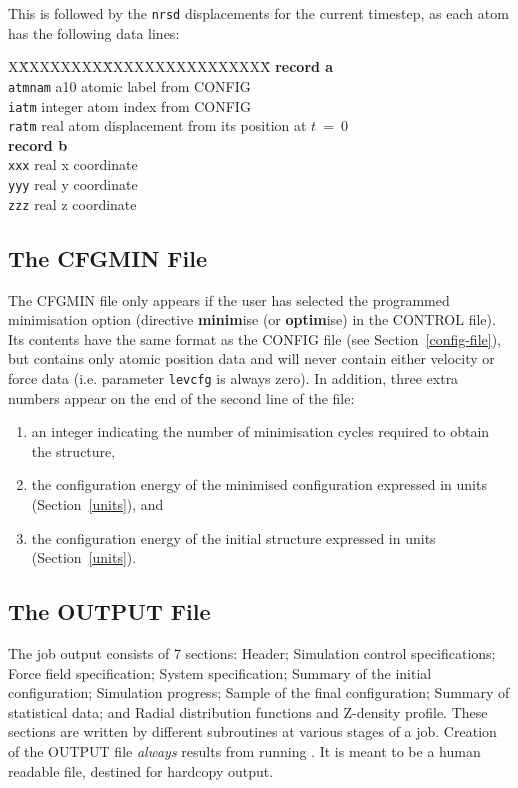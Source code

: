 This is followed by the {\tt nrsd} displacements for the current
timestep, as each atom has the following data lines:
\begin{tabbing}
X\=XXXXXXXX\=XXXXXXXXXXXXXXXX\=\kill
{\bf record a}  \\
\> {\tt atmnam} \> a10     \> atomic label from CONFIG \\
\> {\tt iatm}   \> integer \> atom index from CONFIG \\
\> {\tt ratm}   \> real    \> atom displacement from its position at $t~=~0$ \\
{\bf record b} \\
\> {\tt xxx}    \> real    \> x coordinate \\
\> {\tt yyy}    \> real    \> y coordinate \\
\> {\tt zzz}    \> real    \> z coordinate
\end{tabbing}

\subsection{The CFGMIN File}
\label{cfgminfile}

The CFGMIN file only appears if the user has selected the programmed
minimisation option (directive {\bf minim}ise (or {\bf optim}ise)
in the CONTROL file).  Its contents have the same format as the
CONFIG file (see Section~\ref{config-file}), but contains only atomic
position data and will never contain either velocity or force data
(i.e. parameter {\tt levcfg} is always zero).  In addition, three
extra numbers appear on the end of the second line of the file:
\begin{enumerate}
\item an integer indicating the number of minimisation cycles
required to obtain the structure,
\item the configuration energy of the minimised configuration expressed
in \D units (Section~\ref{units}), and
\item the configuration energy of the initial structure expressed
in \D units (Section~\ref{units}).
\end{enumerate}

\subsection{The OUTPUT File}
\label{output-file}

The job output consists of 7 sections: Header; Simulation control
specifications; Force field specification; System specification;
Summary of the initial configuration; Simulation progress; Sample of
the final configuration; Summary of statistical data; and Radial
distribution functions and Z-density profile.  These sections are
written by different subroutines at various stages of a job.
Creation of the OUTPUT file {\em always} results from running \D. It
is meant to be a human readable file, destined for hardcopy output.

